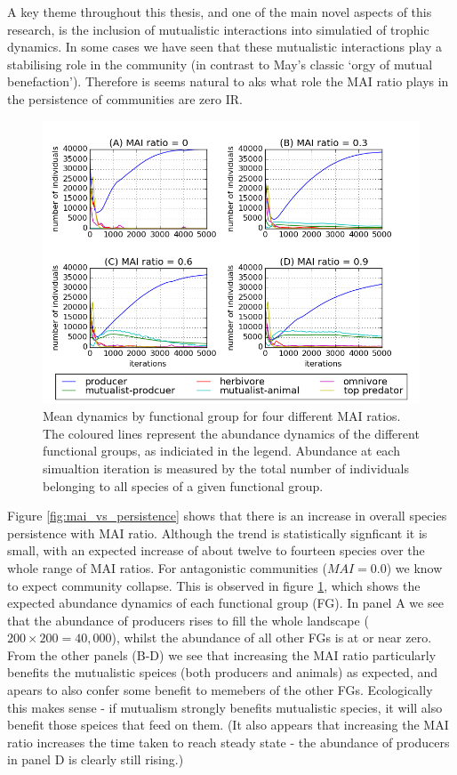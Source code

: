 A key theme throughout this thesis, and one of the main novel aspects of this research, is the inclusion of mutualistic interactions into simulatied of trophic dynamics. In some cases we have seen that these mutualistic interactions play a stabilising role in the community (in contrast to May's classic `orgy of mutual benefaction'). Therefore is seems natural to aks what role the MAI ratio plays in the persistence of communities are zero IR.

\begin{figure}[h!]
	\centering
	\includegraphics[width=0.8\linewidth]{"figures/mean_trophic_dynamics"}
	\caption{Mean dynamics by functional group for four different MAI ratios. The coloured lines represent the abundance dynamics of the different functional groups, as indiciated in the legend. Abundance at each simualtion iteration is measured by the total number of individuals belonging to all species of a given functional group.}
	\label{fig:mvp_mean_dynamics}
\end{figure}


Figure \ref{fig:mai_vs_persistence} shows that there is an increase in overall species persistence with MAI ratio. Although the trend is statistically signficant it is small, with an expected increase of about twelve to fourteen species over the whole range of MAI ratios. For antagonistic communities ($MAI=0.0$) we know to expect community collapse. This is observed in figure \ref{fig:mvp_mean_dynamics}, which shows the expected abundance dynamics of each functional group (FG). In panel A we see that the abundance of producers rises to fill the whole landscape ($200 \times 200=40,000$), whilst the abundance of all other FGs is at or near zero. From the other panels (B-D) we see that increasing the MAI ratio particularly benefits the mutualistic speices (both producers and animals) as expected, and apears to also confer some benefit to memebers of the other FGs. Ecologically this makes sense - if mutualism strongly benefits mutualistic species, it will also benefit those speices that feed on them. (It also appears that increasing the MAI ratio increases the time taken to reach steady state - the abundance of producers in panel D is clearly still rising.) 

